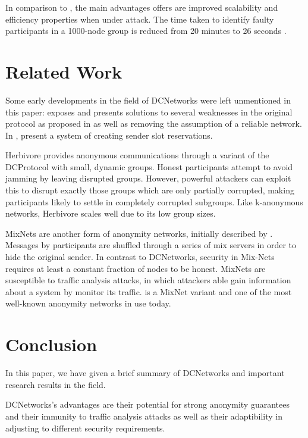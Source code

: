 In comparison to \Dissent, the main advantages \Verdict offers are 
improved scalability and efficiency properties when under attack. The time taken to
identify faulty participants in a 1000-node group is reduced from 20 minutes to 26 seconds \cite{corrigan2013proactively}.


\section{Related Work}

Some early developments in the field of \acp{DCNetwork} were left unmentioned in this paper:
\cite{waidner1989dining} exposes and presents solutions to several weaknesses in the
original protocol as proposed in \cite{journals/joc/Chaum88} as well as removing the assumption
of a reliable network. In \cite{bos1990detection}, \citeauthor{bos1990detection} present a system of creating sender slot reservations.

Herbivore \cite{goel2003herbivore} provides anonymous communications through a variant of the
\ac{DCProtocol} with small, dynamic groups. Honest participants attempt to avoid jamming by
leaving disrupted groups. However, powerful attackers can exploit this to disrupt exactly those groups
which are only partially corrupted, making participants likely to settle in completely corrupted subgroups.
Like k-anonymous networks, Herbivore scales well due to its low group sizes.


\acp{MixNet} are another form of anonymity networks, initially described by \citeauthor{journals/cacm/Chaum81}
\cite{journals/cacm/Chaum81}. Messages by participants are shuffled through a series of mix servers
in order to hide the original sender. In contrast to \acp{DCNetwork}, security in Mix-Nets requires
at least a constant fraction of nodes to be honest. \acp{MixNet} are susceptible to traffic analysis attacks,
in which attackers able gain information about a system by monitor its traffic.
\Tor \cite{conf/uss/DingledineMS04} is a \ac{MixNet} variant and one of the most well-known anonymity networks
in use today.

\section{Conclusion}

In this paper, we have given a brief summary of \acp{DCNetwork} and important
research results in the field.

\acp{DCNetwork}'s advantages are their potential for strong anonymity guarantees
and their immunity to traffic analysis attacks as well as their adaptibility in 
adjusting to different security requirements.

